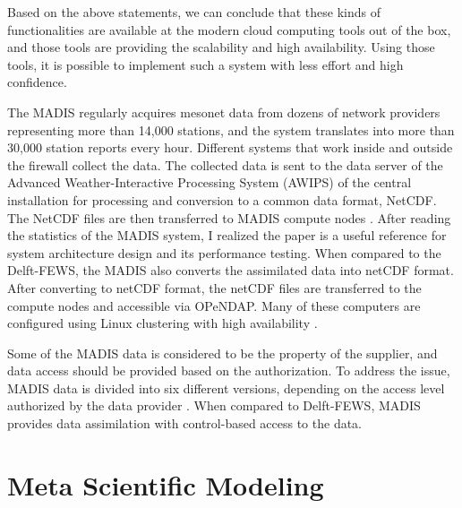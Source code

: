 Based on the above statements, we can conclude that these kinds of functionalities are available at the modern cloud computing tools out of the box, and those tools are providing the scalability and high availability. Using those tools, it is possible to implement such a system with less effort and high confidence.

The MADIS regularly acquires mesonet data from dozens of network providers representing more than 14,000 stations, and the system translates into more than 30,000 station reports every hour. Different systems that work inside and outside the firewall collect the data. The collected data is sent to the data server of the Advanced Weather-Interactive Processing System (AWIPS) of the central installation for processing and conversion to a common data format, NetCDF. The NetCDF files are then transferred to MADIS compute nodes \cite{Macdermaid2005ArchitectureP2.39}. After reading the statistics of the MADIS system, I realized the paper is a useful reference for system architecture design and its performance testing. When compared to the Delft-FEWS, the MADIS also converts the assimilated data into netCDF format. After converting to netCDF format, the netCDF files are transferred to the compute nodes and accessible via OPeNDAP. Many of these computers are configured using Linux clustering with high availability \cite{Macdermaid2005ArchitectureP2.39}.

Some of the MADIS data is considered to be the property of the supplier, and data access should be provided based on the authorization. To address the issue, MADIS data is divided into six different versions, depending on the access level authorized by the data provider \cite{Macdermaid2005ArchitectureP2.39}. When compared to Delft-FEWS, MADIS provides data assimilation with control-based access to the data.

\section{Meta Scientific Modeling}
\label{se:msm}


